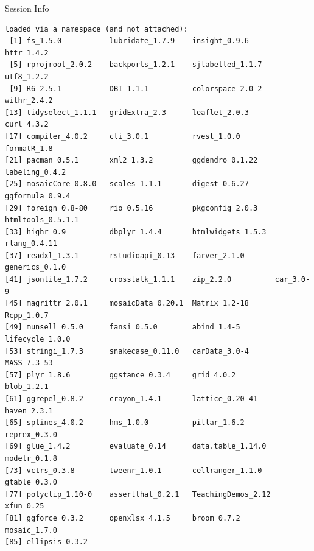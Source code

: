 \documentclass[10pt]{beamer}\usepackage[]{graphicx}\usepackage[]{color}
\makeatletter
\newenvironment{kframe}{%
 \def\at@end@of@kframe{}%
 \ifinner\ifhmode%
  \def\at@end@of@kframe{\end{minipage}}%
  \begin{minipage}{\columnwidth}%
 \fi\fi%
 \def\FrameCommand##1{\hskip\@totalleftmargin \hskip-\fboxsep
 \colorbox{shadecolor}{##1}\hskip-\fboxsep
     \hskip-\linewidth \hskip-\@totalleftmargin \hskip\columnwidth}%
 \MakeFramed {\advance\hsize-\width
   \@totalleftmargin\z@ \linewidth\hsize
   \@setminipage}}%
 {\par\unskip\endMakeFramed%
 \at@end@of@kframe}
\newenvironment{knitrout}{}{} %
\makeatother
\begin{document}
\begin{frame}[fragile]{Session Info}
\begin{knitrout}
\begin{kframe}
\begin{verbatim}
loaded via a namespace (and not attached):
 [1] fs_1.5.0           lubridate_1.7.9    insight_0.9.6      httr_1.4.2        
 [5] rprojroot_2.0.2    backports_1.2.1    sjlabelled_1.1.7   utf8_1.2.2        
 [9] R6_2.5.1           DBI_1.1.1          colorspace_2.0-2   withr_2.4.2       
[13] tidyselect_1.1.1   gridExtra_2.3      leaflet_2.0.3      curl_4.3.2        
[17] compiler_4.0.2     cli_3.0.1          rvest_1.0.0        formatR_1.8       
[21] pacman_0.5.1       xml2_1.3.2         ggdendro_0.1.22    labeling_0.4.2    
[25] mosaicCore_0.8.0   scales_1.1.1       digest_0.6.27      ggformula_0.9.4   
[29] foreign_0.8-80     rio_0.5.16         pkgconfig_2.0.3    htmltools_0.5.1.1 
[33] highr_0.9          dbplyr_1.4.4       htmlwidgets_1.5.3  rlang_0.4.11      
[37] readxl_1.3.1       rstudioapi_0.13    farver_2.1.0       generics_0.1.0    
[41] jsonlite_1.7.2     crosstalk_1.1.1    zip_2.2.0          car_3.0-9         
[45] magrittr_2.0.1     mosaicData_0.20.1  Matrix_1.2-18      Rcpp_1.0.7        
[49] munsell_0.5.0      fansi_0.5.0        abind_1.4-5        lifecycle_1.0.0   
[53] stringi_1.7.3      snakecase_0.11.0   carData_3.0-4      MASS_7.3-53       
[57] plyr_1.8.6         ggstance_0.3.4     grid_4.0.2         blob_1.2.1        
[61] ggrepel_0.8.2      crayon_1.4.1       lattice_0.20-41    haven_2.3.1       
[65] splines_4.0.2      hms_1.0.0          pillar_1.6.2       reprex_0.3.0      
[69] glue_1.4.2         evaluate_0.14      data.table_1.14.0  modelr_0.1.8      
[73] vctrs_0.3.8        tweenr_1.0.1       cellranger_1.1.0   gtable_0.3.0      
[77] polyclip_1.10-0    assertthat_0.2.1   TeachingDemos_2.12 xfun_0.25         
[81] ggforce_0.3.2      openxlsx_4.1.5     broom_0.7.2        mosaic_1.7.0      
[85] ellipsis_0.3.2    
\end{verbatim}
\end{kframe}
\end{knitrout}
	
\end{frame}
\end{document}
